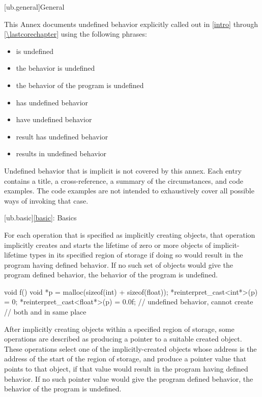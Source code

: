 
[ub.general]{General}

\pnum
This Annex documents
undefined behavior explicitly called out in
\ref{intro} through \ref{\lastcorechapter}
using the following phrases:
\begin{itemize}
\item is undefined
\item the behavior is undefined
\item the behavior of the program is undefined
\item has undefined behavior
\item have undefined behavior
\item result has undefined behavior
\item results in undefined behavior
\end{itemize}
Undefined behavior that is implicit is not covered by this annex.
Each entry contains
a title,
a cross-reference,
a summary of the circumstances,
and code examples.
The code examples are not intended
to exhaustively cover all possible ways of invoking that case.

[ub.basic]{\ref*{basic}: Basics}


\pnum
For each operation that is specified as implicitly creating objects,
that operation implicitly creates and starts the lifetime
of zero or more objects of implicit-lifetime types
in its specified region of storage
if doing so would result in the program having defined behavior.
If no such set of objects would give the program defined behavior,
the behavior of the program is undefined.

\pnum
\begin{example}
\begin{codeblock}
void f()
{
  void *p = malloc(sizeof(int) + sizeof(float));
  *reinterpret_cast<int*>(p) = 0;
  *reinterpret_cast<float*>(p) = 0.0f;  // undefined behavior, cannot create
                                        // both  and  in same place
}
\end{codeblock}
\end{example}


\pnum
After implicitly creating objects within a specified region of storage,
some operations are described as producing a pointer to a
suitable created object.
These operations select one of the implicitly-created objects
whose address is the address of the start of the region of storage,
and produce a pointer value that points to that object,
if that value would result in the program having defined behavior.
If no such pointer value would give the program defined behavior,
the behavior of the program is undefined.

